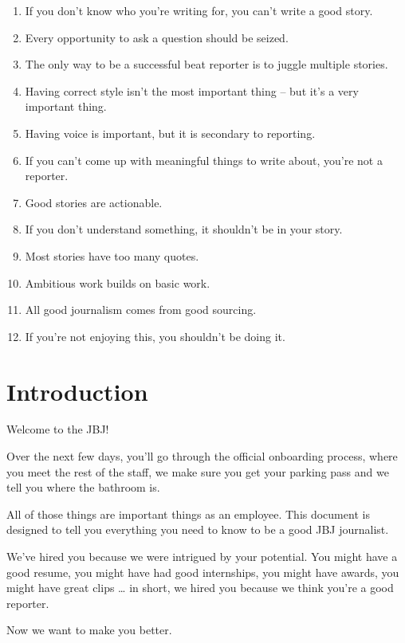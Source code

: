 \documentclass[
  12pt,
  american,
  letterpaperpaper,
  extrafontsizes,onecolumn,openright
  ]{memoir}
\providecommand{\tightlist}{%
  \setlength{\itemsep}{0pt}\setlength{\parskip}{0pt}}
\begin{document}
\begin{enumerate}
\def\labelenumi{\arabic{enumi}.}
\tightlist
\item
  If you don't know who you're writing for, you can't write a good story.
\item
  Every opportunity to ask a question should be seized.
\item
  The only way to be a successful beat reporter is to juggle multiple stories.
\item
  Having correct style isn't the most important thing -- but it's a very important thing.
\item
  Having voice is important, but it is secondary to reporting.
\item
  If you can't come up with meaningful things to write about, you're not a reporter.
\item
  Good stories are actionable.
\item
  If you don't understand something, it shouldn't be in your story.
\item
  Most stories have too many quotes.
\item
  Ambitious work builds on basic work.
\item
  All good journalism comes from good sourcing.
\item
  If you're not enjoying this, you shouldn't be doing it.
\end{enumerate}

\hypertarget{introduction}{%
\chapter*{Introduction}\label{introduction}}

Welcome to the JBJ!

Over the next few days, you'll go through the official onboarding process, where you meet the rest of the staff, we make sure you get your parking pass and we tell you where the bathroom is.

All of those things are important things as an employee. This document is designed to tell you everything you need to know to be a good JBJ journalist.

We've hired you because we were intrigued by your potential. You might have a good resume, you might have had good internships, you might have awards, you might have great clips \ldots{} in short, we hired you because we think you're a good reporter.

Now we want to make you better.
\end{document}
